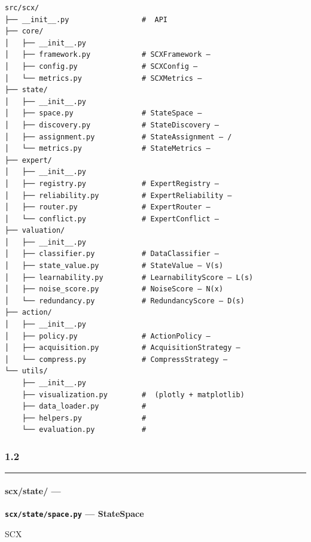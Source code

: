 \documentclass[
  12pt,
]{article}
\begin{document}
\begin{verbatim}
src/scx/
├── __init__.py                 #  API 
├── core/
│   ├── __init__.py
│   ├── framework.py            # SCXFramework — 
│   ├── config.py               # SCXConfig — 
│   └── metrics.py              # SCXMetrics — 
├── state/
│   ├── __init__.py
│   ├── space.py                # StateSpace — 
│   ├── discovery.py            # StateDiscovery — 
│   ├── assignment.py           # StateAssignment — /
│   └── metrics.py              # StateMetrics — 
├── expert/
│   ├── __init__.py
│   ├── registry.py             # ExpertRegistry — 
│   ├── reliability.py          # ExpertReliability — 
│   ├── router.py               # ExpertRouter — 
│   └── conflict.py             # ExpertConflict — 
├── valuation/
│   ├── __init__.py
│   ├── classifier.py           # DataClassifier — 
│   ├── state_value.py          # StateValue — V(s) 
│   ├── learnability.py         # LearnabilityScore — L(s) 
│   ├── noise_score.py          # NoiseScore — N(x) 
│   └── redundancy.py           # RedundancyScore — D(s) 
├── action/
│   ├── __init__.py
│   ├── policy.py               # ActionPolicy — 
│   ├── acquisition.py          # AcquisitionStrategy — 
│   └── compress.py             # CompressStrategy — 
└── utils/
    ├── __init__.py
    ├── visualization.py        #  (plotly + matplotlib)
    ├── data_loader.py          # 
    ├── helpers.py              # 
    └── evaluation.py           # 
\end{verbatim}

\subsubsection{1.2
}\label{ux6a21ux5757ux8be6ux7ec6ux8bbeux8ba1}

\begin{center}\rule{0.5\linewidth}{0.5pt}\end{center}

\paragraph{scx/state/ ---
}\label{scxstate-ux72b6ux6001ux7a7aux95f4ux6a21ux5757}

\textbf{\texttt{scx/state/space.py} --- StateSpace}

 SCX 
\end{document}
